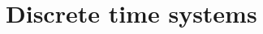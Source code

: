 \documentclass[11pt,a4paper]{book}
\title{\mytitle}
\author{Robby McKilliam}
\theoremstyle{plain}
\numberwithin{equation}{section}
\begin{document}
\frontmatter
\pagestyle{front}
\maketitle

\setcounter{tocdepth}{1}

\tableofcontents
  
\mainmatter
\pagestyle{main}

%  
%  

%  
%  

%  
%  

%  
%  

%  
%  

\chapter{Discrete time systems} \label{cha:discr-time-syst}
 
 




\pagestyle{back}


\end{document}
